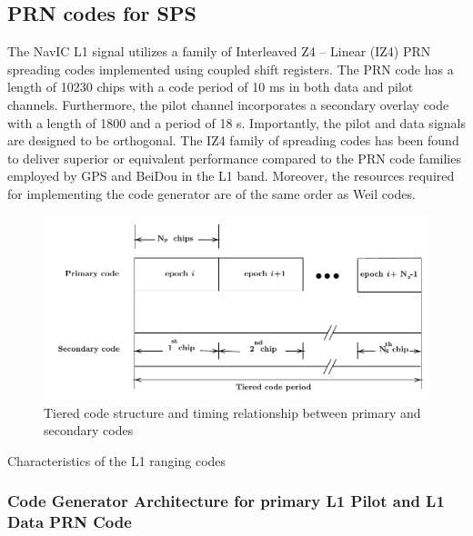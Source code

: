 \subsection{PRN codes for SPS}

\noindent The NavIC L1 signal utilizes a family of Interleaved Z4 – Linear (IZ4) PRN spreading codes implemented using coupled shift registers. The PRN code has a length of 10230 chips with a code period of 10 ms in both data and pilot channels. Furthermore, the pilot channel incorporates a secondary overlay code with a length of 1800 and a period of 18 s. Importantly, the pilot and data signals are designed to be orthogonal.
The IZ4 family of spreading codes has been found to deliver superior or equivalent performance compared to the PRN code families employed by GPS and BeiDou in the L1 band. Moreover, the resources required for implementing the code generator are of the same order as Weil codes.


\begin{figure}[ht]
\centering
\includegraphics[width=\columnwidth]{figs/tiered_code}
\centering
\captionsetup{justification=centering}
\caption{Tiered code structure and timing relationship between primary and secondary codes}
\label{fig:R0_IZ4}
\end{figure}



\begin{table}[h]
\small

\vspace{3mm}
\caption{Characteristics of the L1 ranging codes}
\label{table:L1_ranging}
\end{table}

\subsubsection{Code Generator Architecture for primary L1 Pilot and L1 Data PRN Code}

